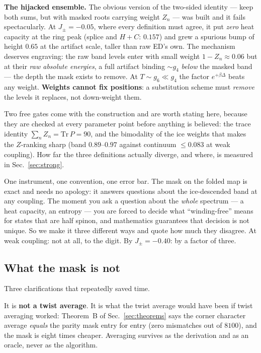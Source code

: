 \documentclass[11pt,a4paper]{article}
\newcommand{\Jpm}{J_{\pm}}
\newcommand{\gfour}{g_4}
\newcommand{\gsix}{g_6}
\begin{document}
\begin{lesson}
\textbf{The hijacked ensemble.}  The obvious version of the two-sided
identity --- keep both sums, but with masked roots carrying weight $Z_n$ ---
was built and it fails spectacularly.  At $\Jpm=-0.05$, where every
definition must agree, it put \emph{zero} heat capacity at the ring peak
(splice and $H+C$: $0.157$) and grew a spurious bump of height $0.65$ at the
artifact scale, taller than raw ED's own.  The mechanism deserves engraving:
the raw band levels enter with small weight $1-Z_n\approx0.06$ but at their
\emph{raw absolute energies}, a full artifact binding $\sim\gfour$
\emph{below} the masked band --- the depth the mask exists to remove.  At
$T\sim\gsix\ll\gfour$ the factor $e^{+\beta\Delta}$ beats any weight.
\textbf{Weights cannot fix positions}: a substitution scheme must
\emph{remove} the levels it replaces, not down-weight them.
\end{lesson}

Two free gates come with the construction and are worth stating here,
because they are checked at every parameter point before anything is
believed: the trace identity $\sum_n Z_n=\mathrm{Tr}\,P=90$, and the
bimodality of the ice weights that makes the $Z$-ranking sharp (band
$0.89$--$0.97$ against continuum $\le0.083$ at weak coupling).  How far the
three definitions actually diverge, and where, is measured in
Sec.~\ref{sec:strong}.

\begin{plainwords}
One instrument, one convention, one error bar.  The mask on the folded map
is exact and needs no apology: it answers questions about the ice-descended
band at any coupling.  The moment you ask a question about the \emph{whole}
spectrum --- a heat capacity, an entropy --- you are forced to decide what
``winding-free'' means for states that are half spinon, and mathematics
guarantees that decision is not unique.  So we make it three different ways
and quote how much they disagree.  At weak coupling: not at all, to the
digit.  By $\Jpm=-0.40$: by a factor of three.
\end{plainwords}

\subsection{What the mask is not}

Three clarifications that repeatedly saved time.

It is \textbf{not a twist average}.  It is what the twist average would have
been if twist averaging worked: Theorem~B of Sec.~\ref{sec:theorems} says
the corner character average \emph{equals} the parity mask entry for entry
(zero mismatches out of $8100$), and the mask is eight times cheaper.
Averaging survives as the derivation and as an oracle, never as the
algorithm.
\end{document}

